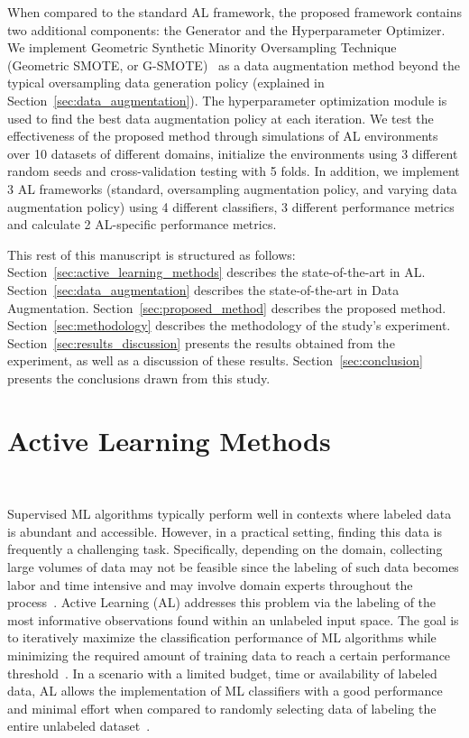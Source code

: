 \documentclass[parskip=full]{scrartcl}
\begin{document}
When compared to the standard AL framework, the proposed framework contains
two additional components: the Generator and the Hyperparameter Optimizer. We
implement Geometric Synthetic Minority Oversampling Technique (Geometric
SMOTE, or G-SMOTE)~\cite{Douzas2019} as a data augmentation method beyond the typical
oversampling data generation policy (explained in
Section~\ref{sec:data_augmentation}). The hyperparameter optimization module
is used to find the best data augmentation policy at each iteration. We test
the effectiveness of the proposed method through simulations of AL
environments over 10 datasets of different domains, initialize the
environments using 3 different random seeds and cross-validation testing with
5 folds. In addition, we implement 3 AL frameworks (standard, oversampling
augmentation policy, and varying data augmentation policy) using 4 different
classifiers, 3 different performance metrics and calculate 2 AL-specific
performance metrics. 

This rest of this manuscript is structured as follows:
Section~\ref{sec:active_learning_methods} describes the state-of-the-art in
AL\@. Section~\ref{sec:data_augmentation} describes the state-of-the-art in Data
Augmentation. Section~\ref{sec:proposed_method} describes the proposed method.
Section~\ref{sec:methodology} describes the methodology of the study's
experiment. Section~\ref{sec:results_discussion} presents the results obtained
from the experiment, as well as a discussion of these results.
Section~\ref{sec:conclusion} presents the conclusions drawn from this study.

\section{Active Learning Methods}~\label{sec:active_learning_methods}

Supervised ML algorithms typically perform well in contexts where labeled data
is abundant and accessible. However, in a practical setting, finding this data
is frequently a challenging task. Specifically, depending on the domain,
collecting large volumes of data may not be feasible since the labeling of
such data becomes labor and time intensive and may involve domain experts
throughout the process~\cite{Cao2020}. Active Learning (AL) addresses this
problem via the labeling of the most informative observations found within an
unlabeled input space. The goal is to iteratively maximize the classification
performance of ML algorithms while minimizing the required amount of training
data to reach a certain performance threshold~\cite{Shrivastava2021}. In a
scenario with a limited budget, time or availability of labeled data, AL
allows the implementation of ML classifiers with a good performance and
minimal effort when compared to randomly selecting data of labeling the entire
unlabeled dataset~\cite{Ren2020}.
\end{document}
